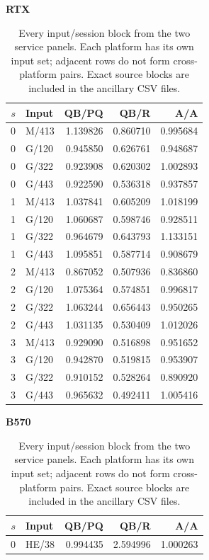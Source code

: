 \begin{table}[t]\centering\footnotesize
\caption{Every input/session block from the two service panels. Each platform has its own input set; adjacent rows do not form cross-platform pairs. Exact source blocks are included in the ancillary CSV files.}\label{tab:serviceblocks}
\begin{minipage}[t]{.485\textwidth}\centering
\textbf{RTX}\par\vspace{4pt}
\setlength{\tabcolsep}{3pt}\begin{tabular}{@{}rlrrr@{}}\toprule
$s$ & Input & QB/PQ & QB/R & A/A\\\midrule
0 & M/413 & 1.139826 & 0.860710 & 0.995684\\
0 & G/120 & 0.945850 & 0.626761 & 0.948687\\
0 & G/322 & 0.923908 & 0.620302 & 1.002893\\
0 & G/443 & 0.922590 & 0.536318 & 0.937857\\
1 & M/413 & 1.037841 & 0.605209 & 1.018199\\
1 & G/120 & 1.060687 & 0.598746 & 0.928511\\
1 & G/322 & 0.964679 & 0.643793 & 1.133151\\
1 & G/443 & 1.095851 & 0.587714 & 0.908679\\
2 & M/413 & 0.867052 & 0.507936 & 0.836860\\
2 & G/120 & 1.075364 & 0.574851 & 0.996817\\
2 & G/322 & 1.063244 & 0.656443 & 0.950265\\
2 & G/443 & 1.031135 & 0.530409 & 1.012026\\
3 & M/413 & 0.929090 & 0.516898 & 0.951652\\
3 & G/120 & 0.942870 & 0.519815 & 0.953907\\
3 & G/322 & 0.910152 & 0.528264 & 0.890920\\
3 & G/443 & 0.965632 & 0.492411 & 1.005416\\
\bottomrule\end{tabular}\end{minipage}
\hfill
\begin{minipage}[t]{.485\textwidth}\centering
\textbf{B570}\par\vspace{4pt}
\setlength{\tabcolsep}{3pt}\begin{tabular}{@{}rlrrr@{}}\toprule
$s$ & Input & QB/PQ & QB/R & A/A\\\midrule
0 & HE/38 & 0.994435 & 2.594996 & 1.000263\\

\end{tabular}
\end{minipage}
\end{table}
